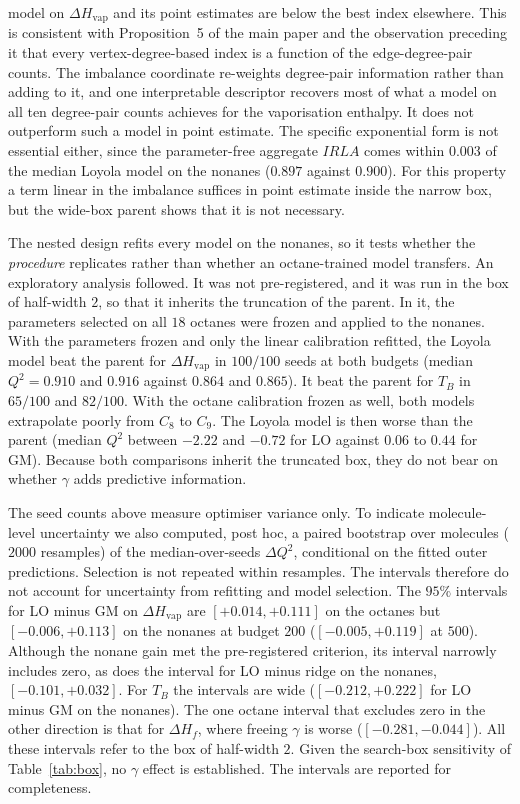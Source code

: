 \documentclass[a5paper, 10pt]{article}
\theoremstyle{plain}
\theoremstyle{remark}
\theoremstyle{definition}
\begin{document}
model on $\Delta H_{\mathrm{vap}}$ and its point estimates are below the
best index elsewhere. This is consistent with Proposition~5 of the main paper and the observation preceding it that every vertex-degree-based index is a function of the edge-degree-pair counts. The imbalance coordinate re-weights degree-pair
information rather than adding to it, and one interpretable descriptor
recovers most of what a model on all ten degree-pair counts achieves
for the vaporisation enthalpy. It does not outperform such a model in
point estimate. The
specific exponential form is not essential either, since the
parameter-free aggregate $IRLA$ comes within $0.003$ of the median
Loyola model on the nonanes ($0.897$ against $0.900$). For this
property a term linear in the imbalance suffices in point estimate inside
the narrow box, but the wide-box parent shows that it is not necessary.

The nested design refits every model on the nonanes, so it tests
whether the \emph{procedure} replicates rather than whether an
octane-trained model transfers. An exploratory analysis
followed. It was not pre-registered, and it was run in the box of
half-width $2$, so that it inherits the truncation of the parent. In
it, the parameters selected on all $18$ octanes were frozen and applied
to the nonanes. With the parameters frozen and only the linear
calibration refitted, the Loyola model beat the parent for
$\Delta H_{\mathrm{vap}}$ in $100/100$ seeds at both budgets (median
$Q^2 = 0.910$ and $0.916$ against $0.864$ and $0.865$). It beat the
parent for $T_B$ in $65/100$ and $82/100$. With the octane calibration
frozen as well, both models extrapolate poorly from $C_8$ to $C_9$. The
Loyola model is then worse than the parent (median $Q^2$ between
$-2.22$ and $-0.72$ for LO against $0.06$ to $0.44$ for GM). Because
both comparisons inherit the truncated box, they do not bear on whether
$\gamma$ adds predictive information.

The seed counts above measure optimiser variance only. To indicate
molecule-level uncertainty we also computed, post hoc, a paired
bootstrap over molecules ($2000$ resamples) of the median-over-seeds
$\Delta Q^2$, conditional on the fitted outer predictions. Selection is
not repeated within resamples. The intervals therefore do not account
for uncertainty from refitting and model selection. The $95\%$ intervals
for LO minus GM on $\Delta H_{\mathrm{vap}}$ are $[+0.014, +0.111]$ on
the octanes but $[-0.006, +0.113]$ on the nonanes at budget $200$
($[-0.005, +0.119]$ at $500$). Although the nonane gain met the
pre-registered criterion, its interval narrowly includes zero, as does
the interval for LO minus ridge on the nonanes, $[-0.101, +0.032]$.
For $T_B$ the intervals are wide ($[-0.212, +0.222]$ for LO minus GM on
the nonanes). The one octane interval that excludes zero in the other
direction is that for $\Delta H_f$, where freeing $\gamma$ is worse
($[-0.281, -0.044]$). All these intervals refer to the box of
half-width $2$. Given the search-box sensitivity of Table~\ref{tab:box}, no $\gamma$ effect
is established. The intervals are reported for
completeness.
\end{document}
